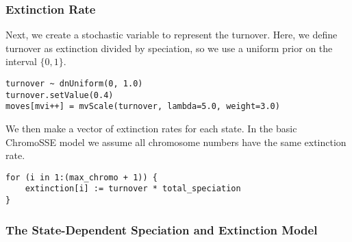 \subsubsection{Extinction Rate}

Next, we create
a stochastic variable to represent the turnover.
Here, we define turnover as extinction divided by speciation,
so we use a uniform prior on the interval $\{0,1\}$.
{\tt \begin{snugshade*}
\begin{lstlisting}
turnover ~ dnUniform(0, 1.0)
turnover.setValue(0.4)
moves[mvi++] = mvScale(turnover, lambda=5.0, weight=3.0)
\end{lstlisting}
\end{snugshade*}
}
We then make a vector of extinction rates for each state.
In the basic ChromoSSE model we assume all chromosome 
numbers have the same extinction rate.
{\tt \begin{snugshade*}
\begin{lstlisting}
for (i in 1:(max_chromo + 1)) {
    extinction[i] := turnover * total_speciation
}
\end{lstlisting}
\end{snugshade*}
}

\subsubsection{The State-Dependent Speciation and Extinction Model}

